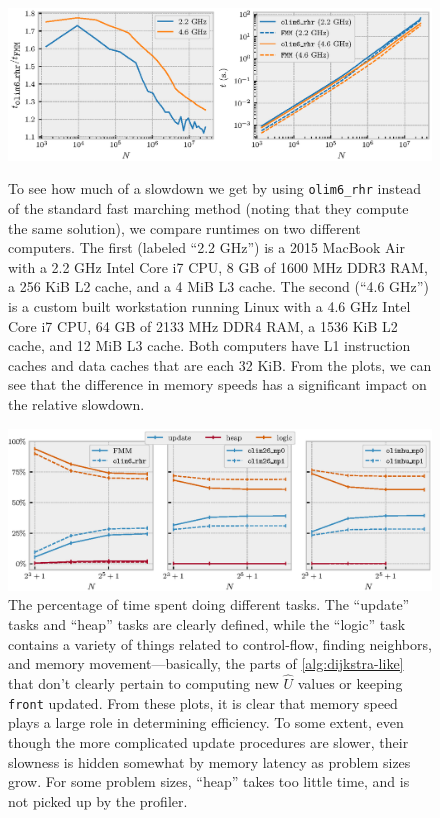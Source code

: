\documentclass[sisc-eikonal.tex]{subfiles}
\begin{document}
\begin{figure}
  \centering
  \includegraphics{speed-comparison.eps}%
  \vspace{-1.5em}
  \caption{To see how much of a slowdown we get by using
    \texttt{olim6\_rhr} instead of the standard fast marching method
    (noting that they compute the same solution), we compare runtimes
    on two different computers. The first (labeled ``2.2 GHz'') is a
    2015 MacBook Air with a 2.2 GHz Intel Core i7 CPU, 8 GB of 1600
    MHz DDR3 RAM, a 256 KiB L2 cache, and a 4 MiB L3 cache. The second
    (``4.6 GHz'') is a custom built workstation running Linux with a
    4.6 GHz Intel Core i7 CPU, 64 GB of 2133 MHz DDR4 RAM, a 1536 KiB
    L2 cache, and 12 MiB L3 cache. Both computers have L1 instruction
    caches and data caches that are each 32 KiB. From the plots, we
    can see that the difference in memory speeds has a significant
    impact on the relative slowdown.}\label{fig:speed-comparison}%
  \vspace{-1em}
  \includegraphics{tasks.eps}%
  \vspace{-0.5em}
  \caption{ The percentage of time spent doing different tasks. The
    ``update'' tasks and ``heap'' tasks are clearly defined, while the
    ``logic'' task contains a variety of things related to
    control-flow, finding neighbors, and memory movement---basically,
    the parts of \cref{alg:dijkstra-like} that don't clearly pertain
    to computing new $\hat{U}$ values or keeping \texttt{front}
    updated. From these plots, it is clear that memory speed plays a
    large role in determining efficiency. To some extent, even though
    the more complicated update procedures are slower, their slowness
    is hidden somewhat by memory latency as problem sizes grow. For
    some problem sizes, ``heap'' takes too little time, and is not
    picked up by the profiler.}\label{fig:tasks}
\end{figure}
\end{document}
